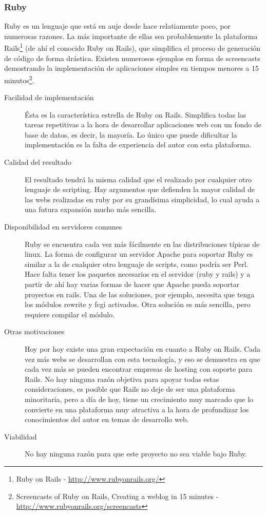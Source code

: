 \subsubsection{Ruby}
Ruby es un lenguaje que está en auje desde hace relatiamente poco, por numerosas razones. La más importante de ellas sea probablemente la plataforma Rails\footnote{Ruby on Rails - \url{http://www.rubyonrails.org/}} (de ahí el conocido Ruby on Rails), que simplifica el proceso de generación de código de forma drástica. Existen numerosos ejemplos en forma de screencasts demostrando la implementación de aplicaciones simples en tiempos menores a 15 minutos\footnote{Screencasts of Ruby on Rails, Creating a weblog in 15 minutes - \url{http://www.rubyonrails.org/screencasts}}.

\begin{description}
	\item[Facilidad de implementación] Ésta es la característica estrella de Ruby on Rails. Simplifica todas las tareas repetitivas a la hora de desarrollar aplicaciones web con un fondo de base de datos, es decir, la mayoría. Lo único que puede dificultar la implementación es la falta de experiencia del autor con esta plataforma.
	\item[Calidad del resultado] El resultado tendrá la misma calidad que el realizado por cualquier otro lenguaje de scripting. Hay argumentos que defienden la mayor calidad de las webs realizadas en ruby por su grandísima simplicidad, lo cual ayuda a una futura expansión mucho más sencilla.
	\item[Disponibilidad en servidores comunes] Ruby se encuentra cada vez más fácilmente en las distribuciones típicas de linux. La forma de configurar un servidor Apache para soportar Ruby es similar a la de cualquier otro lenguaje de scripts, como podría ser Perl. Hace falta tener los paquetes necesarios en el servidor (ruby y rails) y a partir de ahí hay varias formas de hacer que Apache pueda soportar proyectos en rails. Una de las soluciones, por ejemplo, necesita que tenga los módulos rewrite y fcgi activados. Otra solución es más sencilla, pero requiere compilar el módulo.
	\item[Otras motivaciones] Hoy por hoy existe una gran expectación en cuanto a Ruby on Rails. Cada vez más webs se desarrollan con esta tecnología, y eso se demuestra en que cada vez más se pueden encontrar empresas de hosting con soporte para Rails. No hay ninguna razón objetiva para apoyar todas estas consideraciones, es posible que Rails no deje de ser una plataforma minoritaria, pero a día de hoy, tiene un crecimiento muy marcado que lo convierte en una plataforma muy atractiva a la hora de profundizar los conocimientos del autor en temas de desarrollo web.
	\item[Viabilidad] No hay ninguna razón para que este proyecto no sea viable bajo Ruby.
\end{description}

